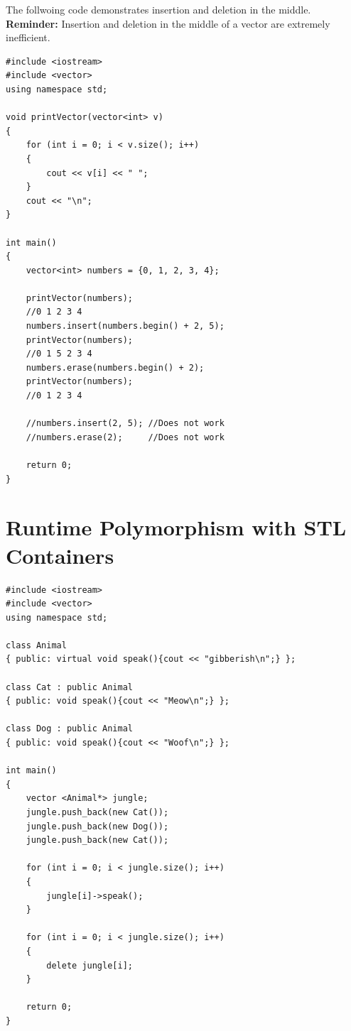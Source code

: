 \documentclass[12pt]{article}
\begin{document}
\noindent The follwoing code demonstrates insertion and deletion in the middle. \\

\noindent \textbf{Reminder:} Insertion and deletion in the middle of a vector are extremely inefficient.

\begin{verbatim}
#include <iostream>
#include <vector>
using namespace std;

void printVector(vector<int> v)
{
    for (int i = 0; i < v.size(); i++)
    {
    	cout << v[i] << " ";
	}
	cout << "\n";	
}

int main()
{
    vector<int> numbers = {0, 1, 2, 3, 4};

    printVector(numbers);
    //0 1 2 3 4
    numbers.insert(numbers.begin() + 2, 5);
    printVector(numbers);
    //0 1 5 2 3 4
    numbers.erase(numbers.begin() + 2);
    printVector(numbers);
    //0 1 2 3 4

    //numbers.insert(2, 5); //Does not work
    //numbers.erase(2);     //Does not work

    return 0;
}
\end{verbatim}

\newpage
{}
\section*{Runtime Polymorphism with STL Containers}

\begin{verbatim}
#include <iostream>
#include <vector>
using namespace std;

class Animal
{ public: virtual void speak(){cout << "gibberish\n";} };

class Cat : public Animal
{ public: void speak(){cout << "Meow\n";} };

class Dog : public Animal
{ public: void speak(){cout << "Woof\n";} };

int main()
{
    vector <Animal*> jungle;
    jungle.push_back(new Cat());
    jungle.push_back(new Dog());
    jungle.push_back(new Cat());

    for (int i = 0; i < jungle.size(); i++)
    {
        jungle[i]->speak();
    }

    for (int i = 0; i < jungle.size(); i++)
    {
        delete jungle[i];
    }

    return 0;
}
\end{verbatim}
\end{document}
